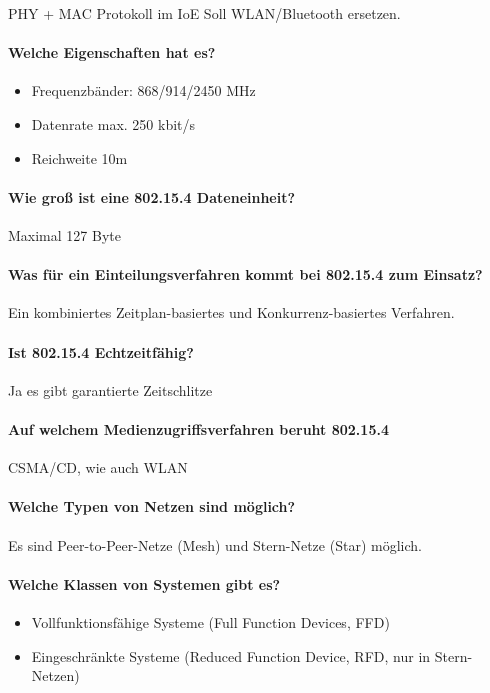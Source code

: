 	
	PHY + MAC Protokoll im IoE
	Soll WLAN/Bluetooth ersetzen.
	
	\paragraph{Welche Eigenschaften hat es?}
	\begin{itemize}
		\item Frequenzbänder: 868/914/2450 MHz
		\item Datenrate max. 250 kbit/s
		\item Reichweite 10m
	\end{itemize}

	\paragraph{Wie groß ist eine 802.15.4 Dateneinheit?}
	Maximal 127 Byte
	
	\paragraph{Was für ein Einteilungsverfahren kommt bei 802.15.4 zum Einsatz?}
	Ein kombiniertes Zeitplan-basiertes und Konkurrenz-basiertes Verfahren.
	
	\paragraph{Ist 802.15.4 Echtzeitfähig?}
	Ja es gibt garantierte Zeitschlitze
	
	\paragraph{Auf welchem Medienzugriffsverfahren beruht 802.15.4}
	CSMA/CD, wie auch WLAN
	
	\paragraph{Welche Typen von Netzen sind möglich?}
	Es sind Peer-to-Peer-Netze (Mesh) und Stern-Netze (Star) möglich.
	
	\paragraph{Welche Klassen von Systemen gibt es?}
	\begin{itemize}
		\item Vollfunktionsfähige Systeme (Full Function Devices, FFD)
		\item Eingeschränkte Systeme (Reduced Function Device, RFD, nur in Stern-Netzen)
	\end{itemize}
	
